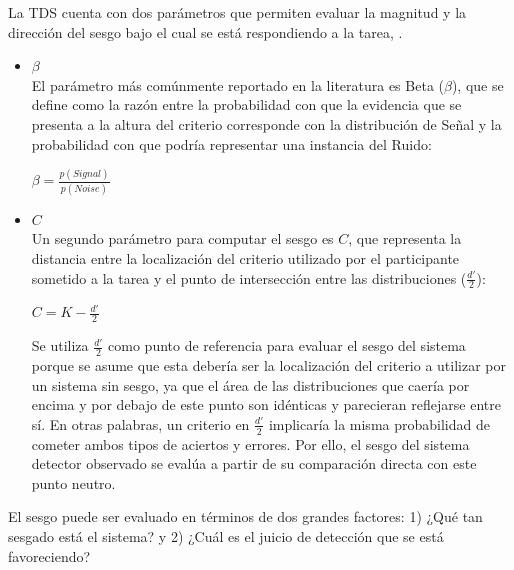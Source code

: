 \begin{itemize}
La TDS cuenta con dos parámetros que permiten evaluar la magnitud y la dirección del sesgo bajo el cual se está respondiendo a la tarea, \parencite{Stainslaw1999, Macmillan1996}.\\

\begin{itemize}
\item \underline{$\beta$}\\

El parámetro más comúnmente reportado en la literatura es Beta ($\beta$), que se define como la razón entre la probabilidad con que la evidencia que se presenta a la altura del criterio corresponde con la distribución de Señal y la probabilidad con que podría representar una instancia del Ruido: \\

\begin{center}
$\beta = \frac{p(Signal)}{p(Noise)}$ \\
\end{center}

\item \underline{$C$}\\

Un segundo parámetro para computar el sesgo es $C$, que representa la distancia entre la localización del criterio utilizado por el participante sometido a la tarea y el punto de intersección entre las distribuciones ($\frac{d'}{2}$):\\

\begin{center}
$C =  K - \frac{d'}{2}$ \\
\end{center}

Se utiliza $\frac{d'}{2}$ como punto de referencia para evaluar el sesgo del sistema porque se asume que esta debería ser la localización del criterio a utilizar por un sistema sin sesgo, ya que el área de las distribuciones que caería por encima y por debajo de este punto son idénticas y parecieran reflejarse entre sí. En otras palabras, un criterio en $\frac{d'}{2}$ implicaría la misma probabilidad de cometer ambos tipos de aciertos y errores. Por ello, el sesgo del sistema detector observado se evalúa a partir de su comparación directa con este punto neutro.\\

\end{itemize}

El sesgo puede ser evaluado en términos de dos grandes factores: 1) ¿Qué tan sesgado está el sistema? y 2) ¿Cuál es el juicio de detección que se está favoreciendo?\\


\end{itemize}
